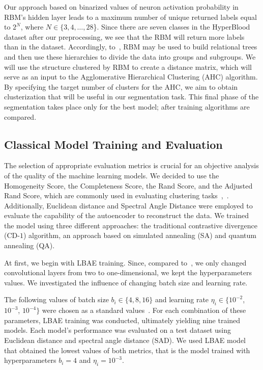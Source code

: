 \documentclass[runningheads]{llncs}
\begin{document}
Our approach based on binarized values of neuron activation probability in RBM's
hidden layer leads to a maximum number of unique returned labels equal to $2^N$,
where $N \in \{3,4,\ldots,28$\}. Since there are seven classes in the HyperBlood
dataset after our preprocessing, we see that the RBM will return more labels
than in the dataset. Accordingly, to~\cite{Decelle2023}, RBM may be used to
build relational trees and then use these hierarchies to divide the data into
groups and subgroups. We will use the structure clustered by RBM to create a
distance matrix, which will serve as an input to the Agglomerative Hierarchical
Clustering (AHC) algorithm. By specifying the target number of clusters for the
AHC, we aim to obtain clusterization that will be useful in our segmentation
task. This final phase of the segmentation takes place only for the best model;
after training algorithms are compared.

\subsection{Classical Model Training and Evaluation}
The selection of appropriate evaluation metrics is crucial for an objective
analysis of the quality of the machine learning models. We decided to use the
Homogeneity Score, the Completeness Score, the Rand Score, and the Adjusted Rand
Score, which are commonly used in evaluating clustering
tasks~\cite{Emmons2016},~\cite{Rosenberg2007}. Additionally, Euclidean distance
and Spectral Angle Distance were employed to evaluate the capability of the
autoencoder to reconstruct the data. We trained the model using three different
approaches: the traditional contrastive divergence (CD-$1$) algorithm, an
approach based on simulated annealing (SA) and quantum annealing (QA).

At first, we begin with LBAE training. Since, compared to~\cite{QBM4EO}, we only
changed convolutional layers from two to one-dimensional, we kept the
hyperparameters values. We investigated the influence of changing batch size and
learning rate.

The following values of batch size $b_i \in \{4, 8, 16\}$ and learning rate
$\eta_i \in \{10^{-2}$, $10^{-3}$, $10^{-4}\}$ were chosen as a standard
values~\cite{raschka2019}. For each combination of these parameters, LBAE
training was conducted, ultimately yielding nine trained models. Each model's
performance was evaluated on a test dataset using Euclidean distance and
spectral angle distance (SAD). We used LBAE model that obtained the lowest
values of both metrics, that is the model trained with hyperparameters $b_i=4$
and $\eta_i=10^{-3}$.
\end{document}
